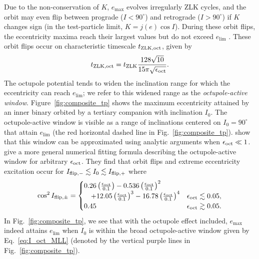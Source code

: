 \documentclass[
        fleqn,
        usenatbib,
    ]{mnras}
\newcommand*{\p}[1]{\left(#1\right)}
\begin{document}
Due to the non-conservation of $K$, $e_{\max}$ evolves irregularly ZLK cycles,
and the orbit may even flip between prograde ($I < 90^\circ$) and retrograde ($I
> 90^\circ$) if $K$ changes sign (in the test-particle limit, $K = j(e) \cos
I$). During these orbit flips, the eccentricity maxima reach their largest
values but do not exceed $e_{\lim}$ \citep{lithwick2011eccentric, LML15,
anderson2016formation}. These orbit flips occur on characteristic timescale
$t_{\rm ZLK, oct}$, given by \citep{antognini2015timescales}
\begin{align}
    t_{\rm ZLK, oct} = t_{\rm ZLK}\frac{128\sqrt{10}}{
        15\pi\sqrt{\epsilon_{\rm oct}}}.\label{eq:def_tzlkoct}
\end{align}
The octupole potential tends to widen the inclination range for which the
eccentricity can reach $e_{\lim}$; we refer to this widened range as the
\emph{octupole-active window}. Figure~\ref{fig:composite_tp} shows the maximum
eccentricity attained by an inner binary orbited by a tertiary companion with
inclination $I_0$. The octupole-active window is visible as a range of
inclinations centered on $I_0 = 90^\circ$ that attain $e_{\lim}$ (the red
horizontal dashed line in Fig.~\ref{fig:composite_tp}). \citet{katz2011long}
show that this window can be approximated using analytic arguments when
$\epsilon_{\rm oct} \ll 1$. \citet{MLL16} give a more general numerical fitting
formula describing the octupole-active window for arbitrary $\epsilon_{\rm
oct}$. They find that orbit flips and extreme eccentricity excitation occur for
$I_{\rm flip, -} \lesssim I_0 \lesssim I_{\rm flip, +}$ where
\begin{align}
    \cos^2 I_{\rm flip, \pm} = \begin{cases}
        0.26\p{\frac{\epsilon_{\rm oct}}{0.1}}
            - 0.536\p{\frac{\epsilon_{\rm oct}}{0.1}}^2\\
            \quad + 12.05\p{\frac{\epsilon_{\rm oct}}{0.1}}^3
            - 16.78\p{\frac{\epsilon_{\rm oct}}{0.1}}^4
            & \epsilon_{\rm oct} \lesssim 0.05,\\
        0.45 & \epsilon_{\rm oct} \gtrsim 0.05.
    \end{cases} \label{eq:I_oct_MLL}
\end{align}
In Fig.~\ref{fig:composite_tp}, we see that with the octupole effect included,
$e_{\max}$ indeed attains $e_{\lim}$ when $I_0$ is within the broad
octupole-active window given by Eq.~\eqref{eq:I_oct_MLL} (denoted by the
vertical purple lines in Fig.~\ref{fig:composite_tp}).
\end{document}
